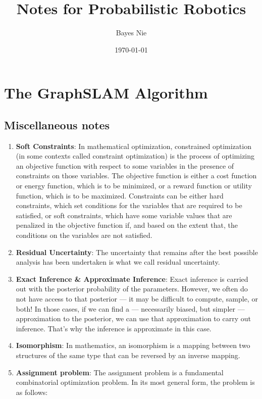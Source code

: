 \documentclass[12pt, a4paper]{memoir}
\title{Notes for Probabilistic Robotics}
\author{Bayes Nie}
\date{\today}
\begin{document}
\maketitle

\chapter{The GraphSLAM Algorithm}
\section{Miscellaneous notes}
\begin{enumerate}[leftmargin=*]
    \item \textbf{Soft Constraints}: In mathematical optimization, constrained optimization (in some contexts called constraint optimization) is the process of optimizing an objective function with respect to some variables in the presence of constraints on those variables. The objective function is either a cost function or energy function, which is to be minimized, or a reward function or utility function, which is to be maximized. Constraints can be either hard constraints, which set conditions for the variables that are required to be satisfied, or soft constraints, which have some variable values that are penalized in the objective function if, and based on the extent that, the conditions on the variables are not satisfied.
    \item \textbf{Residual Uncertainty}: The uncertainty that remains after the best possible analysis has been undertaken is what we call residual uncertainty.
    \item \textbf{Exact Inference \& Approximate Inference}: Exact inference is carried out with the posterior probability of the parameters. However, we often do not have access to that posterior — it may be difficult to compute, sample, or both! In those cases, if we can find a — necessarily biased, but simpler — approximation to the posterior, we can use that approximation to carry out inference. That’s why the inference is approximate in this case. 
    \item \textbf{Isomorphism}: In mathematics, an isomorphism is a mapping between two structures of the same type that can be reversed by an inverse mapping. 
    \item \textbf{Assignment problem}: The assignment problem is a fundamental combinatorial optimization problem. In its most general form, the problem is as follows: 
    \begin{shaded}

\end{shaded}
\end{enumerate}
\end{document}
